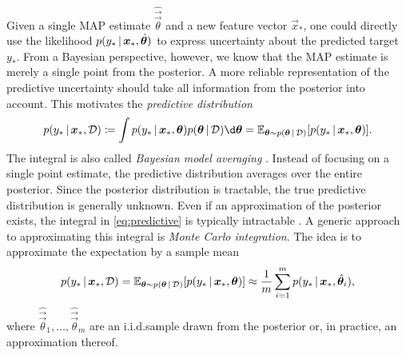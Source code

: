 Given a single MAP estimate $\hat{\vec{\vec{\theta}}}$ and a new feature vector $\vec{x}_*$, one could directly use the likelihood $p(y_* \,|\, \bm{x}_*, \hat{\bm{\bm{\theta}}})$ to express uncertainty about the predicted target $y_*$. From a Bayesian perspective, however, we know that the MAP estimate is merely a single point from the posterior. A more reliable representation of the predictive uncertainty should take all information from the posterior into account. This motivates the \emph{predictive distribution}
\begin{equation} \label{eq:predictive}
  p(y_* \given \vec{x}_*, \mathcal{D}) \defeq \int p(y_* \given \vec{x}_*, \vec{\vec{\theta}}) p(\vec{\vec{\theta}} \given \mathcal{D}) \d\vec{\vec{\theta}}
  = \mathbb{E}_{\vec{\vec{\theta}} \sim p(\vec{\vec{\theta}} \given \mathcal{D})}[p(y_* \given \vec{x}_*, \vec{\vec{\theta}})].
\end{equation}
The integral is also called \emph{Bayesian model averaging} \citep{wilsonBayesianDeepLearning2020}. Instead of focusing on a single point estimate, the predictive distribution averages over the entire posterior. Since the posterior distribution is tractable, the true predictive distribution is generally unknown. Even if an approximation of the posterior exists, the integral in \eqref{eq:predictive} is typically intractable \citep{wilsonBayesianDeepLearning2020,gawlikowskiSurveyUQ2023}. A generic approach to approximating this integral is \emph{Monte Carlo integration}. The idea is to approximate the expectation by a sample mean
\begin{equation*}
  p(y_* \,|\, \bm{x}_*, \mathcal{D})
  = \mathbb{E}_{\bm{\bm{\theta}} \sim p(\bm{\bm{\theta}} \,|\, \mathcal{D})}[p(y_* \,|\, \bm{x}_*, \bm{\bm{\theta}})]
  \approx \frac{1}{m} \sum_{i=1}^{m} p(y_* \,|\, \bm{x}_*, \hat{\bm{\bm{\theta}}}_i),
\end{equation*}
where $\hat{\vec{\vec{\theta}}}_1, \dots, \hat{\vec{\vec{\theta}}}_m$ are an i.i.d.\@ sample drawn from the posterior or, in practice, an approximation thereof.

